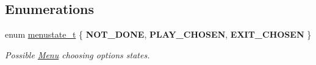 \subsection*{Enumerations}
\begin{DoxyCompactItemize}
\item 
\hypertarget{group__menu_gafed699a28fc53900e4236f240af3b8c6}{}\label{group__menu_gafed699a28fc53900e4236f240af3b8c6} 
enum \hyperlink{group__menu_gafed699a28fc53900e4236f240af3b8c6}{menustate\+\_\+t} \{ {\bfseries N\+O\+T\+\_\+\+D\+O\+NE}, 
{\bfseries P\+L\+A\+Y\+\_\+\+C\+H\+O\+S\+EN}, 
{\bfseries E\+X\+I\+T\+\_\+\+C\+H\+O\+S\+EN}
 \}\begin{DoxyCompactList}\small\item\em Possible \hyperlink{struct_menu}{Menu} choosing options\textquotesingle{} states. \end{DoxyCompactList}
\end{DoxyCompactItemize}
